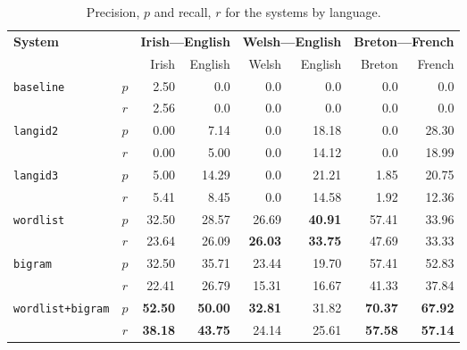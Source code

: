 \documentclass[11pt]{article}
\begin{document}
\begin{table}
\begin{center}
\begin{tabular}{|lc|r|r|r|r|r|r|}
\hline
\multirow{2}{*}{\textbf{System}}            & & \multicolumn{2}{c}{\textbf{Irish---English}} & \multicolumn{2}{|c|}{\textbf{Welsh---English}} & \multicolumn{2}{c|}{\textbf{Breton---French}}  \\\cline{3-8}
                                          &      &  Irish &  English & Welsh  & English & Breton & French \\
\hline 
\multirow{2}{*}{\texttt{baseline}}        &  $p$ &  2.50   & 0.0      & 0.0   & 0.0 & 0.0 & 0.0 \\
                                          & $r$  & 2.56    & 0.0      & 0.0   & 0.0 & 0.0 & 0.0 \\
\hline
\multirow{2}{*}{\texttt{langid2}}         &  $p$ &  0.00   & 7.14     & 0.0   & 18.18    & 0.0 & 28.30 \\
                                          & $r$  & 0.00    & 5.00     & 0.0   & 14.12 & 0.0 & 18.99 \\
\hline
\multirow{2}{*}{\texttt{langid3}}         &  $p$ &  5.00   & 14.29    & 0.0   & 21.21 & 1.85 & 20.75 \\
                                          & $r$  & 5.41    & 8.45     & 0.0   & 14.58 & 1.92 & 12.36 \\
\hline
\multirow{2}{*}{\texttt{wordlist}}        &  $p$ &  32.50 & 28.57     & 26.69 & {\bf 40.91} & 57.41 & 33.96 \\
                                          & $r$  & 23.64  & 26.09     & {\bf 26.03} & {\bf 33.75} & 47.69 & 33.33 \\
\hline
\multirow{2}{*}{\texttt{bigram}}          &  $p$ &  32.50   & 35.71   & 23.44 & 19.70  & 57.41 & 52.83 \\
                                          & $r$  & 22.41    & 26.79   & 15.31 & 16.67 & 41.33 & 37.84 \\
\hline
\multirow{2}{*}{\texttt{wordlist+bigram}} &  $p$ &  {\bf 52.50}   & {\bf 50.00}   & {\bf 32.81} & 31.82 & {\bf 70.37} & {\bf 67.92} \\
                                          & $r$  & {\bf 38.18}    & {\bf 43.75}   & 24.14 & 25.61 & {\bf 57.58} & {\bf 57.14} \\
\hline
\end{tabular}
\end{center}
\caption{Precision, $p$ and recall, $r$ for the systems by language.}
\label{table:precisionrecall}

\end{table}
\end{document}
